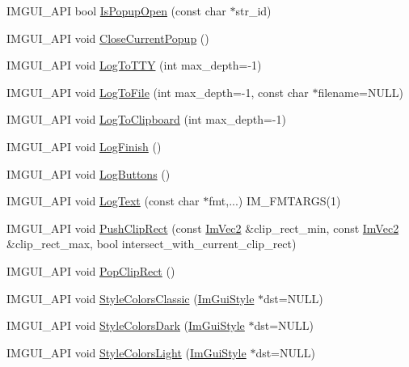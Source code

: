 \begin{DoxyCompactItemize}
\item 
I\+M\+G\+U\+I\+\_\+\+A\+PI bool \hyperlink{namespace_im_gui_a8f25c1565fca7cb9796c54e5cebc44ee}{Is\+Popup\+Open} (const char $\ast$str\+\_\+id)
\item 
I\+M\+G\+U\+I\+\_\+\+A\+PI void \hyperlink{namespace_im_gui_aeaec6479834db7918260fc082107f90b}{Close\+Current\+Popup} ()
\item 
I\+M\+G\+U\+I\+\_\+\+A\+PI void \hyperlink{namespace_im_gui_a37696f5296f33ae4218f53b40b81cccc}{Log\+To\+T\+TY} (int max\+\_\+depth=-\/1)
\item 
I\+M\+G\+U\+I\+\_\+\+A\+PI void \hyperlink{namespace_im_gui_ab62461a65c153b9f40842debef8aa755}{Log\+To\+File} (int max\+\_\+depth=-\/1, const char $\ast$filename=N\+U\+LL)
\item 
I\+M\+G\+U\+I\+\_\+\+A\+PI void \hyperlink{namespace_im_gui_a81add991d176834b8a6e315dfc78e4f7}{Log\+To\+Clipboard} (int max\+\_\+depth=-\/1)
\item 
I\+M\+G\+U\+I\+\_\+\+A\+PI void \hyperlink{namespace_im_gui_a2ebcd048d1ca025fb972e1c2e920e3f3}{Log\+Finish} ()
\item 
I\+M\+G\+U\+I\+\_\+\+A\+PI void \hyperlink{namespace_im_gui_a7bd295da4be19bab98262c76fcaeb4fb}{Log\+Buttons} ()
\item 
I\+M\+G\+U\+I\+\_\+\+A\+PI void \hyperlink{namespace_im_gui_aa548475d8f771ab6524d73d900a41198}{Log\+Text} (const char $\ast$fmt,...) I\+M\+\_\+\+F\+M\+T\+A\+R\+GS(1)
\item 
I\+M\+G\+U\+I\+\_\+\+A\+PI void \hyperlink{namespace_im_gui_a11c8bd8676e1281e15b24c9615b6904a}{Push\+Clip\+Rect} (const \hyperlink{struct_im_vec2}{Im\+Vec2} \&clip\+\_\+rect\+\_\+min, const \hyperlink{struct_im_vec2}{Im\+Vec2} \&clip\+\_\+rect\+\_\+max, bool intersect\+\_\+with\+\_\+current\+\_\+clip\+\_\+rect)
\item 
I\+M\+G\+U\+I\+\_\+\+A\+PI void \hyperlink{namespace_im_gui_aef1c8a6e5a3c70cb10d03d2a2a66dfd8}{Pop\+Clip\+Rect} ()
\item 
I\+M\+G\+U\+I\+\_\+\+A\+PI void \hyperlink{namespace_im_gui_a1cf931a42a10f71150def3ce222434b6}{Style\+Colors\+Classic} (\hyperlink{struct_im_gui_style}{Im\+Gui\+Style} $\ast$dst=N\+U\+LL)
\item 
I\+M\+G\+U\+I\+\_\+\+A\+PI void \hyperlink{namespace_im_gui_a26c67fc14081b359566d5e135cd8c767}{Style\+Colors\+Dark} (\hyperlink{struct_im_gui_style}{Im\+Gui\+Style} $\ast$dst=N\+U\+LL)
\item 
I\+M\+G\+U\+I\+\_\+\+A\+PI void \hyperlink{namespace_im_gui_ae1fc558bfbc557b228d63f7facfc86e1}{Style\+Colors\+Light} (\hyperlink{struct_im_gui_style}{Im\+Gui\+Style} $\ast$dst=N\+U\+LL)

\end{DoxyCompactItemize}
